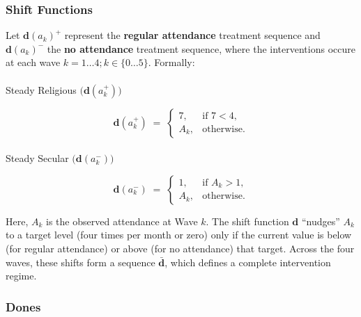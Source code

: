\documentclass[
  single column]{article}
\makeatletter
\let\oldparagraph\paragraph
\renewcommand{\paragraph}{
    \@ifstar
      \xxxParagraphStar
      \xxxParagraphNoStar
  }
\newcommand{\xxxParagraphStar}[1]{\oldparagraph*{#1}\mbox{}}
\newcommand{\xxxParagraphNoStar}[1]{\oldparagraph{#1}\mbox{}}
\makeatother
\begin{document}
\subsubsection{Shift Functions}\label{shift-functions}

Let \(\boldsymbol{\text{d}}(a_k)^+\) represent the \textbf{regular
attendance} treatment sequence and \(\boldsymbol{\text{d}}(a_k)^-\) the
\textbf{no attendance} treatment sequence, where the interventions
occure at each wave \(k = 1\dots 4; k\in \{0\dots 5\}\). Formally:

\paragraph{\texorpdfstring{Steady Religious
\(\bigl(\boldsymbol{\text{d}}(a_k^+)\bigr)\)}{Steady Religious \textbackslash bigl(\textbackslash boldsymbol\{\textbackslash text\{d\}\}(a\_k\^{}+)\textbackslash bigr)}}\label{steady-religious-biglboldsymboltextda_kbigr}

\[
\boldsymbol{\text{d}} (a_k^+) 
\;=\; 
\begin{cases}
7, & \text{if } 7 < 4,\\[6pt]
A_k, & \text{otherwise.}
\end{cases}
\]

\paragraph{\texorpdfstring{Steady Secular
\(\bigl(\boldsymbol{\text{d}}(a_k^-)\bigr)\)}{Steady Secular \textbackslash bigl(\textbackslash boldsymbol\{\textbackslash text\{d\}\}(a\_k\^{}-)\textbackslash bigr)}}\label{steady-secular-biglboldsymboltextda_k-bigr}

\[
\boldsymbol{\text{d}}(a_k^-) 
\;=\; 
\begin{cases}
1, & \text{if } A_k > 1,\\[6pt]
A_k, & \text{otherwise.}
\end{cases}
\]

Here, \(A_k\) is the observed attendance at Wave \(k\). The shift
function \(\boldsymbol{\text{d}}\) ``nudges'' \(A_k\) to a target level
(four times per month or zero) only if the current value is below (for
regular attendance) or above (for no attendance) that target. Across the
four waves, these shifts form a sequence
\(\boldsymbol{\bar{\boldsymbol{\text{d}}}}\), which defines a complete
intervention regime.

\subsubsection{Dones}\label{dones}
\end{document}
